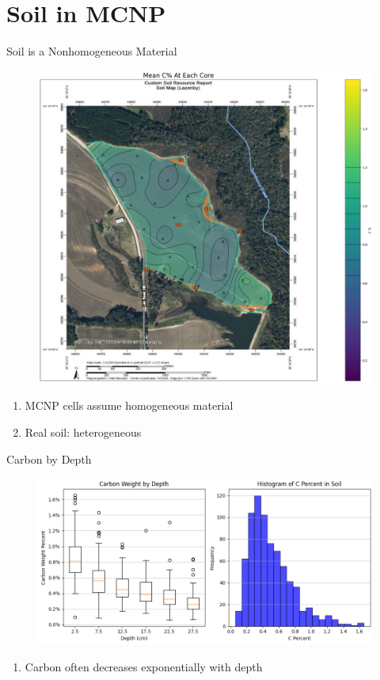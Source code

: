 \documentclass[10pt,hyperref={colorlinks,citecolor=blue,urlcolor=peking_blue,linkcolor=}]{beamer}
\theoremstyle{plain}
\begin{document}
\section{Soil in MCNP}
\begin{frame}{Soil is a Nonhomogeneous Material}
\begin{figure}[Carbon case study over a field]
\begin{center}
\includegraphics[width=.5\linewidth]{../Figures/CaseStudy/fieldstudy.png}
\end{center}
\end{figure}
\begin{enumerate}
\item MCNP cells assume homogeneous material
\item Real soil: heterogeneous
\end{enumerate}
\end{frame}
\begin{frame}{Carbon by Depth}
\begin{figure}[Carbon case study over depth]
\begin{center}
\includegraphics[width=1\linewidth]{../Figures/CaseStudy/depthstudy.png}
\end{center}
\end{figure}
\begin{enumerate}
\item Carbon often decreases exponentially with depth
\end{enumerate}
\end{frame}
\end{document}
